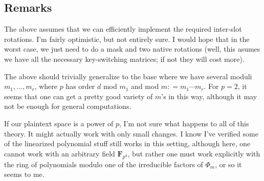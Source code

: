 \documentclass[11pt]{article}
\newcommand{\FF}{\mathbf{F}}
\newcommand{\deq}{\mathrel{\mathop:}=}
\begin{document}
\subsection*{Remarks}

The above assumes that we can efficiently implement the
required inter-slot rotations.
I'm fairly optimistic, but not entirely sure.
I would hope that in the worst case, we just need to do
a mask and two native rotations (well, this asumes we have
all the necessary key-switching matrices; if not they will cost more).

The above should trivially generalize to the base where
we have several moduli $m_1, \ldots, m_r$, where
$p$ has order $d$ mod $m_1$ and mod $m \deq m_1 \cdots m_r$.
For $p = 2$, it seems that one can get a pretty good variety of
$m$'s in this way, although it may not be enough for general
computations.

If our plaintext space is a power of $p$, I'm not sure what happens
to all of this theory. 
It might actually work with only small changes.
I know I've verified some of the linearized polynomial stuff
still works in this setting, although here, one cannot work
with an arbitrary field $\FF_{p^d}$,
but rather one must work explicitly with the ring of polynomials
modulo one of the irreducible factors of $\Phi_m$, or so it seems
to me.
\end{document}
